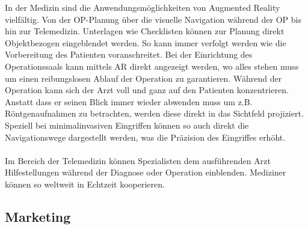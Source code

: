 In der Medizin sind die Anwendungsmöglichkeiten von Augmented Reality vielfältig. Von der OP-Planung über die visuelle Navigation während der OP bis hin zur Telemedizin. Unterlagen wie Checklisten können zur Planung direkt Objektbezogen eingeblendet werden. So kann immer verfolgt werden wie die Vorbereitung des Patienten voranschreitet. Bei der Einrichtung des Operationssaals kann mittels AR direkt angezeigt werden, wo alles stehen muss um einen reibungslosen Ablauf der Operation zu garantieren. Während der Operation kann sich der Arzt voll und ganz auf den Patienten konzentrieren. Anstatt dass er seinen Blick immer wieder abwenden muss um z.B. Röntgenaufnahmen zu betrachten, werden diese direkt in das Sichtfeld projiziert. Speziell bei minimalinvasiven Eingriffen können so auch direkt die Navigationswege dargestellt werden, was die Präzision des Eingriffes erhöht.
\paragraph{}
Im Bereich der Telemedizin können Spezialisten dem ausführenden Arzt Hilfestellungen während der Diagnose oder Operation einblenden. Mediziner können so weltweit in Echtzeit kooperieren.

\subsection{Marketing}


